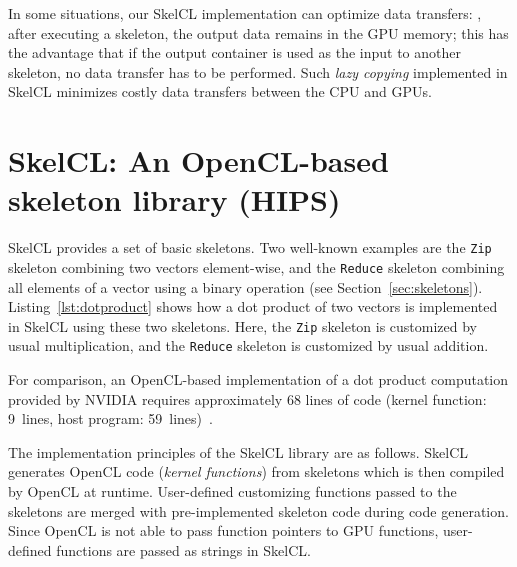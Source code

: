 In some situations, our SkelCL implementation can optimize data transfers:
\eg, after executing a skeleton, the output data remains in the GPU memory;
this has the advantage that if the output container is used as the input to another skeleton, no data transfer has to be performed.
Such \emph{lazy copying} implemented in SkelCL minimizes costly data transfers between the CPU and GPUs.





\newpage







\section{SkelCL: An OpenCL-based skeleton library (HIPS)}

SkelCL provides a set of basic skeletons.
Two well-known examples are the \texttt{Zip} skeleton combining two vectors element-wise, and the \texttt{Reduce} skeleton combining all elements of a vector using a binary operation (see Section~\ref{sec:skeletons}).
Listing~\ref{lst:dotproduct} shows how a dot product of two vectors is implemented in SkelCL using these two skeletons.
Here, the \texttt{Zip} skeleton is customized by usual multiplication, and the \texttt{Reduce} skeleton is customized by usual addition.

For comparison, an OpenCL-based implementation of a dot product computation provided by NVIDIA requires approximately 68 lines of code (kernel function: 9~lines, host program: 59~lines)~\cite{CUDASDK-10}.

The implementation principles of the SkelCL library are as follows.
SkelCL generates OpenCL code (\emph{kernel functions}) from skeletons which is then compiled by OpenCL at runtime.
User-defined customizing functions passed to the skeletons are merged with pre-implemented skeleton code during code generation.
Since OpenCL is not able to pass function pointers to GPU functions, user-defined functions are passed as strings in SkelCL.

